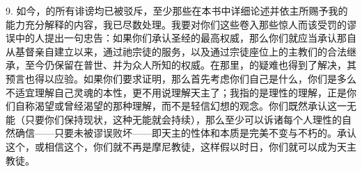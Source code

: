 9. 如今，的所有诽谤均已被驳斥，至少那些在本书中详细论述并依主所赐予我的能力充分解释的内容，我已尽数处理。我要对你们这些卷入那些惊人而该受罚的谬误中的人提出一句忠告：如果你们承认圣经的最高权威，那么你们就应当承认那自从基督亲自建立以来，通过祂宗徒的服务，以及通过宗徒座位上的主教们的合法继承，至今仍保留在普世、并为众人所知的权威。在那里，的疑难也得到了解决，其预言也得以应验。如果你们要求证明，那么首先考虑你们自己是什么，你们是多么不适宜理解自己灵魂的本性，更不用说理解天主了；我指的是理性的理解，正是你们自称渴望或曾经渴望的那种理解，而不是轻信幻想的观念。你们既然承认这一无能（只要你们保持现状，这种无能就会持续），那么至少可以诉诸每个人理性的自然确信——只要未被谬误败坏——即天主的性体和本质是完美不变与不朽的。承认这个，或相信这个，你们就不再是摩尼教徒，这样假以时日，你们就可以成为天主教徒。\par

